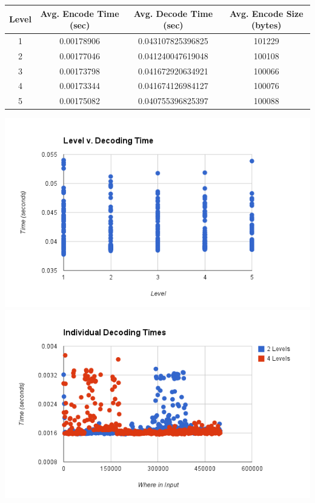 \documentclass{article}
\begin{document}
\begin{center}\smallskip
    \begin{tabular}{ | c | c | c | c |}
    \hline
    Level & Avg. Encode Time (sec) & Avg. Decode Time (sec) & Avg. Encode Size (bytes) \\ \hline
    1 & 0.00178906 & 0.043107825396825 & 101229\\
    2 & 0.00177046 & 0.041240047619048 & 100108\\
    3 & 0.00173798 & 0.041672920634921 & 100066\\
    4 & 0.00173344 & 0.041674126984127 & 100076\\
    5 & 0.00175082 & 0.040755396825397 & 100088\\ \hline
    \end{tabular}
\end{center}



\includegraphics[scale=0.4]{images/betterlevel_v_decode}
\includegraphics[scale=0.4]{images/individual_decodetime}
\afterpage{\vfill}
\end{document}
